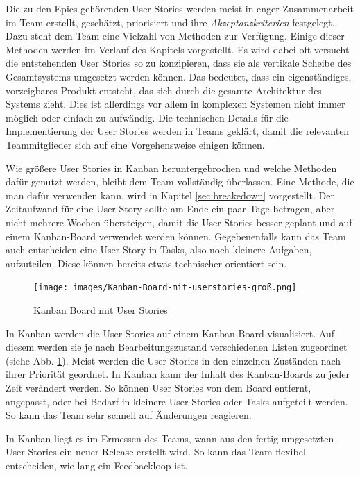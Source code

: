 \documentclass[acmtog]{acmart}
\begin{document}
Die zu den Epics gehörenden User Stories werden meist in enger Zusammenarbeit im Team erstellt, 
geschätzt, priorisiert und ihre \emph{Akzeptanzkriterien} festgelegt. Dazu steht dem Team eine Vielzahl 
von Methoden zur Verfügung. Einige dieser Methoden werden im Verlauf des Kapitels vorgestellt. 
Es wird dabei oft versucht die entstehenden User Stories so zu konzipieren, dass sie als vertikale 
Scheibe des Gesamtsystems umgesetzt werden können. Das bedeutet, dass ein eigenständiges, vorzeigbares 
Produkt entsteht, das sich durch die gesamte Architektur des Systems zieht. Dies ist allerdings 
vor allem in komplexen Systemen nicht immer möglich oder einfach zu aufwändig. Die technischen Details für die Implementierung 
der User Stories werden in Teams geklärt, damit die relevanten Teammitglieder sich auf eine Vorgehensweise 
einigen können. \cite{agileprocesses}

Wie größere User Stories in Kanban heruntergebrochen und welche Methoden dafür genutzt werden, bleibt 
dem Team vollständig überlassen. Eine Methode, die man dafür verwenden kann, wird in Kapitel \ref{sec:breakedown} vorgestellt. 
Der Zeitaufwand für eine User Story sollte am Ende ein paar Tage betragen, aber nicht mehrere Wochen übersteigen, damit die User Stories besser 
geplant und auf einem Kanban-Board verwendet werden können. Gegebenenfalls kann das Team auch entscheiden eine User Story in Tasks, also noch 
kleinere Aufgaben, aufzuteilen. Diese können bereits etwas technischer orientiert sein. \cite{agileprocesses}

\begin{figure}[t]
  \centering
  \texttt{[image: images/Kanban-Board-mit-userstories-groß.png]}
  \caption{Kanban Board mit User Stories}
    \label{fig:kanban-board}
  \Description{}
\end{figure}

In Kanban werden die User Stories auf einem Kanban-Board visualisiert. Auf diesem werden sie je nach Bearbeitungszustand verschiedenen 
Listen zugeordnet (siehe Abb. \ref{fig:kanban-board}). Meist werden die User Stories in den einzelnen 
Zuständen nach ihrer Priorität geordnet. In Kanban kann der Inhalt des Kanban-Boards zu jeder Zeit verändert werden. 
So können User Stories von dem Board entfernt, angepasst, oder bei Bedarf in kleinere User Stories oder Tasks aufgeteilt werden. So kann das Team sehr schnell 
auf Änderungen reagieren. \cite{agileprocesses}

In Kanban liegt es im Ermessen des Teams, wann aus den fertig umgesetzten User Stories ein neuer Release 
erstellt wird. So kann das Team flexibel entscheiden, wie lang ein Feedbackloop ist. \cite{agileprocesses}
\end{document}
